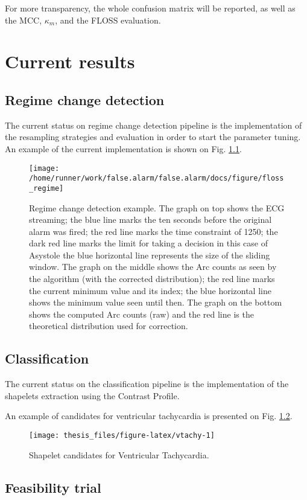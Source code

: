 \documentclass[12pt,twoside]{fmupthesis}
\begin{document}
For more transparency, the whole confusion matrix will be reported, as well as the MCC, \(\kappa_m\), and
the FLOSS evaluation.

\hypertarget{current-results}{%
\chapter{Current results}\label{current-results}}

\hypertarget{regime-change-detection}{%
\section{Regime change detection}\label{regime-change-detection}}

The current status on regime change detection pipeline is the implementation of the resampling strategies and evaluation in
order to start the parameter tuning. An example of the current implementation is shown on Fig. \ref{fig:flossregime}.
\begin{figure}

{\centering \texttt{[image: /home/runner/work/false.alarm/false.alarm/docs/figure/floss\_regime]} 

}

\caption{Regime change detection example. The graph on top shows the ECG streaming; the blue line marks the ten seconds before the original alarm was fired; the red line marks the time constraint of 1250; the dark red line marks the limit for taking a decision in this case of Asystole the blue horizontal line represents the size of the sliding window. The graph on the middle shows the Arc counts as seen by the algorithm (with the corrected distribution); the red line marks the current minimum value and its index; the blue horizontal line shows the minimum value seen until then. The graph on the bottom shows the computed Arc counts (raw) and the red line is the theoretical distribution used for correction.}\label{fig:flossregime}
\end{figure}
\hypertarget{classification-1}{%
\section{Classification}\label{classification-1}}

The current status on the classification pipeline is the implementation of the shapelets extraction
using the Contrast Profile.

An example of candidates for ventricular tachycardia is presented on Fig. \ref{fig:vtachy}.
\begin{figure}

{\centering \texttt{[image: thesis\_files/figure-latex/vtachy-1]} 

}

\caption{Shapelet candidates for Ventricular Tachycardia.}\label{fig:vtachy}
\end{figure}
\hypertarget{feasibility-trial}{%
\section{Feasibility trial}\label{feasibility-trial}}
\end{document}
